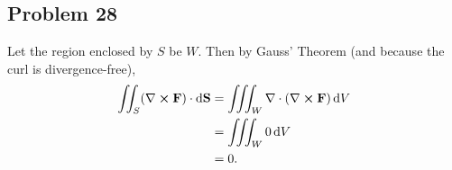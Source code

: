 \documentclass[11pt]{article}
\renewcommand{\vec}[1]{\mathbf{#1}}
\renewcommand{\div}{\nabla \cdot}
\renewcommand{\curl}{\nabla \cross}
\begin{document}

\subsection*{Problem 28}

Let the region enclosed by $S$ be $W$. Then by Gauss' Theorem (and because the curl is divergence-free),
\begin{align*}
	\iint_{S} (\curl \mathbf{F}) \cdot \dd{\vec{S}} &= \iiint_{W} \div (\curl \mathbf{F}) \dd{V} \\
	&= \iiint_{W} 0 \dd{V} \\
	&= 0.
\end{align*}


\end{document}
